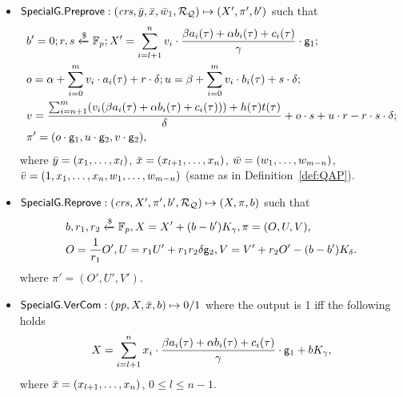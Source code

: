 \begin{definition}
\begin{itemize}
\begin{comment}
{We should say what is the difference from Groth16.Setup or it is the same. I think in general in $ \SpecialG $, you should tell which part is from Groth16 or Legosnark and where we change it while describing the algorithms. It will be much clear for the reader to verify. You have notes in the end but I think it is better to have it while describing since you can tell more right away from the algorithm than in the end of everything}
\end{comment}
\item ${\mathsf{SpecialG}}.{\mathsf{Preprove}}: (\mathit{crs}, \bar{y}, \bar{x}, \bar{w}_1, \mathcal{R}_{\mathcal{Q}}) \mapsto (X', \pi', b')$ such that \\
\begin{align*}
&b' = 0; r, s\xleftarrow{\$} \mathbb{F}_p; X' = \sum_{i=l+1}^{n} v_i \cdot  \frac{\beta a_i(\tau)+ \alpha b_i(\tau)+ c_i(\tau)}{\gamma} \cdot \mathsf{g}_1;  \\
&o = \alpha + \sum_{i=0}^{m} v_i \cdot a_i(\tau) + r \cdot \delta; u = \beta + \sum_{i=0}^{m} v_i \cdot b_i(\tau) + s \cdot \delta; \\ 
&v = \frac{\sum_{i=n+1}^{m} (v_i (\beta a_i(\tau)+ \alpha b_i(\tau)+ c_i(\tau))) + h(\tau)t(\tau)}{\delta}   + o\cdot s + u \cdot r - r \cdot s \cdot \delta; \\
& \pi' = (o \cdot \mathsf{g}_1, u \cdot \mathsf{g}_2, v \cdot \mathsf{g}_2), 
\end{align*}
where $\bar{y} = (x_1, \ldots, x_l)$, $\bar{x} = (x_{l+1}, \ldots, x_n)$, $\bar{w} = (w_1, \ldots, w_{m-n})$, \\
$\bar{v} = (1, x_1, \ldots, x_n, w_1, \ldots, w_{m-n})$ (same as in Definition~\ref{def:QAP}).


\item ${\mathsf{SpecialG}}.{\mathsf{Reprove}}: (\mathit{crs}, X', \pi', b', \mathcal{R}_{\mathcal{Q}}) \mapsto (X, \pi, b)$  such that
\begin{align*}
&b , r_1, r_2  \xleftarrow{\$} \mathbb{F}_p, X = X' + (b- b') K_{\gamma}, \pi = (O, U, V), \\
&O = \frac{1}{r_1} O', U = r_1 U' + r_1r_2 \delta \mathsf{g}_2, V = V' + r_2O'  - (b - b') K_{\delta} .
\end{align*}
\noindent where $\pi' = (O', U', V')$.
 
\item ${\mathsf{SpecialG}}.{\mathsf{VerCom}}: (\mathit{pp}, X, \bar{x}, b) \mapsto 0/1$ where the output is 1 iff the following holds
$$X = \sum_{i=l+1}^{n} x_i \cdot  \frac{\beta a_i(\tau)+ \alpha b_i(\tau)+ c_i(\tau)}{\gamma} \cdot \mathsf{g}_1  + b K_{\gamma},$$
where $\bar{x} = (x_{l+1}, \ldots, x_n)$, $ 0 \leq l \leq n-1$. 


\end{itemize}
\end{definition}
